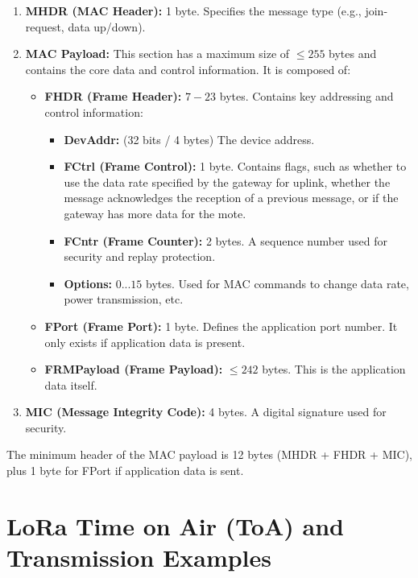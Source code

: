 \documentclass[a4paper, 12pt]{book} %
\begin{document}
\begin{enumerate}
\def\labelenumi{\arabic{enumi}.}
\tightlist
\item
  \textbf{MHDR (MAC Header):} 1 byte. Specifies the message type (e.g.,
  join-request, data up/down).
\item
  \textbf{MAC Payload:} This section has a maximum size of \(\le 255\)
  bytes and contains the core data and control information. It is
  composed of:

  \begin{itemize}
  \tightlist
  \item
    \textbf{FHDR (Frame Header):} \(7-23\) bytes. Contains key
    addressing and control information:

    \begin{itemize}
    \tightlist
    \item
      \textbf{DevAddr:} (32 bits / 4 bytes) The device address.
    \item
      \textbf{FCtrl (Frame Control):} 1 byte. Contains flags, such as
      whether to use the data rate specified by the gateway for uplink,
      whether the message acknowledges the reception of a previous
      message, or if the gateway has more data for the mote.
    \item
      \textbf{FCntr (Frame Counter):} 2 bytes. A sequence number used
      for security and replay protection.
    \item
      \textbf{Options:} \(0...15\) bytes. Used for MAC commands to
      change data rate, power transmission, etc.
    \end{itemize}
  \item
    \textbf{FPort (Frame Port):} 1 byte. Defines the application port
    number. It only exists if application data is present.
  \item
    \textbf{FRMPayload (Frame Payload):} \(\le 242\) bytes. This is the
    application data itself.
  \end{itemize}
\item
  \textbf{MIC (Message Integrity Code):} 4 bytes. A digital signature
  used for security.
\end{enumerate}

The minimum header of the MAC payload is 12 bytes (MHDR + FHDR + MIC),
plus 1 byte for FPort if application data is sent.

\chapter{LoRa Time on Air (ToA) and Transmission
Examples}\label{lora-time-on-air-toa-and-transmission-examples}
\end{document}
